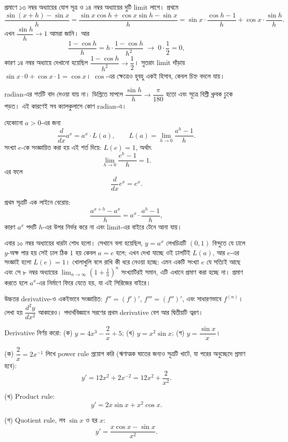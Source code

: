 \documentclass[11pt]{article}
\begin{document}
প্রমাণে ১৩ নম্বর অধ্যায়ের যোগ সূত্র ও ১৪ নম্বর অধ্যায়ের দুটি limit
লাগে। প্রথমে
\[
  \frac{\sin(x+h) - \sin x}{h}
  = \frac{\sin x\cos h + \cos x\sin h - \sin x}{h}
  = \sin x \cdot \frac{\cos h - 1}{h} + \cos x \cdot \frac{\sin h}{h} .
\]
এখন $\dfrac{\sin h}{h} \to 1$ আমরা জানি। আর
\[
  \frac{1 - \cos h}{h} = h \cdot \frac{1-\cos h}{h^{2}}
  \;\longrightarrow\; 0 \cdot \frac{1}{2} = 0 ,
\]
কারণ ১৪ নম্বর অধ্যায়ে দেখানো হয়েছিল $\dfrac{1-\cos h}{h^{2}} \to
\dfrac{1}{2}$। সুতরাং limit দাঁড়ায় $\sin x \cdot 0 + \cos x \cdot 1 = \cos x$।
$\cos$-এর ক্ষেত্রেও হুবহু একই হিসাব, কেবল চিহ্ন বদলে যায়।

radian-এর শর্তটি বাদ দেওয়া যায় না। ডিগ্রিতে মাপলে $\dfrac{\sin h}{h} \to
\dfrac{\pi}{180}$ হতো এবং সূত্রে বিশ্রী ধ্রুবক ঢুকে পড়ত। এই কারণেই সব
ক্যালকুলাসে কোণ radian-এ।

\begin{idea}[$e$-এর সংজ্ঞা ও $e^{x}$-এর derivative]
যেকোনো $a > 0$-এর জন্য
\[
  \frac{d}{dx}a^{x} = a^{x} \cdot L(a),
  \qquad L(a) = \lim_{h \to 0}\frac{a^{h}-1}{h} .
\]
সংখ্যা $e$-কে সংজ্ঞায়িত করা হয় এই শর্ত দিয়ে: $L(e) = 1$, অর্থাৎ
\[
  \lim_{h \to 0}\frac{e^{h}-1}{h} = 1 .
\]
এর ফলে
\[
  \frac{d}{dx}e^{x} = e^{x} .
\]
\end{idea}

প্রথম সূত্রটি এক লাইনে বেরোয়:
\[
  \frac{a^{x+h} - a^{x}}{h} = a^{x} \cdot \frac{a^{h}-1}{h} ,
\]
কারণ $a^{x}$ পদটি $h$-এর উপর নির্ভর করে না এবং limit-এর বাইরে টেনে আনা যায়।

এবার ১০ নম্বর অধ্যায়ের ধারটা শোধ হলো। সেখানে বলা হয়েছিল, $y = a^{x}$
লেখচিত্রটি $(0,1)$ বিন্দুতে যে ঢালে $y$-অক্ষ পার হয় সেই ঢাল ঠিক $1$ হয় কেবল
$a = e$ হলে; এখন দেখা যাচ্ছে ওই ঢালটিই $L(a)$, আর $e$-এর সংজ্ঞাই হলো
$L(e) = 1$। খোলাখুলি বলে রাখি কী ধরে নেওয়া হচ্ছে: এমন একটি সংখ্যা $e$ যে সত্যিই
আছে এবং সে ৮ নম্বর অধ্যায়ের $\lim_{n \to \infty}\left( 1 + \tfrac{1}{n}
\right)^{n}$ সংখ্যাটিরই সমান, এটি এখানে প্রমাণ করা হচ্ছে না। প্রমাণ করতে হলে
$a^{x}$-এর নির্মাণে ফিরে যেতে হয়, যা এই সিরিজের বাইরে।

উচ্চতর derivative-ও একইভাবে সংজ্ঞায়িত: $f'' = (f')'$, $f''' = (f'')'$, এবং
সাধারণভাবে $f^{(n)}$। লেখা হয় $\dfrac{d^{2}y}{dx^{2}}$ আকারেও। পদার্থবিজ্ঞানে
সরণের প্রথম derivative বেগ আর দ্বিতীয়টি ত্বরণ।

\begin{example}
Derivative নির্ণয় করো: (ক) $y = 4x^{3} - \dfrac{2}{x} + 5$;
(খ) $y = x^{2}\sin x$; (গ) $y = \dfrac{\sin x}{x}$।
\end{example}

\begin{solbox}
(ক) $\dfrac{2}{x} = 2x^{-1}$ লিখে power rule প্রয়োগ করি (ঋণাত্মক ঘাতের জন্যও
সূত্রটি খাটে, যা পরের অনুচ্ছেদে প্রমাণ হবে):
\[
  y' = 12x^{2} + 2x^{-2} = 12x^{2} + \frac{2}{x^{2}} .
\]

(খ) Product rule:
\[
  y' = 2x\sin x + x^{2}\cos x .
\]

(গ) Quotient rule, লব $\sin x$ ও হর $x$:
\[
  y' = \frac{x\cos x - \sin x}{x^{2}} .
\]
\end{solbox}
\end{document}
